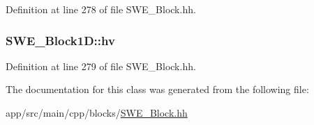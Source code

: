 Definition at line 278 of file S\+W\+E\+\_\+\+Block.\+hh.

\subsubsection[{\texorpdfstring{hv}{hv}}]{ S\+W\+E\+\_\+\+Block1\+D\+::hv}\hypertarget{structSWE__Block1D_aa261d9fcdb400d7da349f41dfa6d5b4f}{}\label{structSWE__Block1D_aa261d9fcdb400d7da349f41dfa6d5b4f}


Definition at line 279 of file S\+W\+E\+\_\+\+Block.\+hh.



The documentation for this class was generated from the following file\+:\begin{DoxyCompactItemize}
\item 
app/src/main/cpp/blocks/\hyperlink{SWE__Block_8hh}{S\+W\+E\+\_\+\+Block.\+hh}\end{DoxyCompactItemize}
